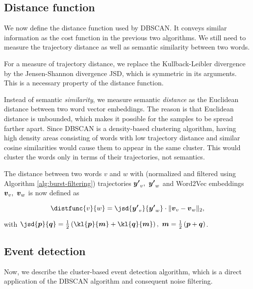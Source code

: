 \subsection{Distance function}
We now define the distance function used by DBSCAN. It conveys similar information as the cost function in the previous two algorithms. We still need to measure the trajectory distance as well as semantic similarity between two words.

For a measure of trajectory distance, we replace the Kullback-Leibler divergence by the Jensen-Shannon divergence JSD, which is symmetric in its arguments. This is a necessary property of the distance function.

Instead of semantic \textit{similarity}, we measure semantic \textit{distance} as the Euclidean distance between two word vector embeddings. The reason is that Euclidean distance is unbounded, which makes it possible for the samples to be spread farther apart. Since DBSCAN is a density-based clustering algorithm, having high density areas consisting of words with low trajectory distance and similar cosine similarities would cause them to appear in the same cluster. This would cluster the words only in terms of their trajectories, not semantics.

The distance between two words $v$ and $w$ with (normalized and filtered using Algorithm \ref{alg:burst-filtering}) trajectories $\vect{\trajn}_{v},\ \vect{\trajn}_{w}$ and Word2Vec embeddings $\embed_{v},\ \embed_{w}$ is now defined as

\begin{equation}
	\distfunc{v}{w} = \jsd{\vect{\trajn}_{v}}{\vect{\trajn}_{w}} \cdot \| \embed_{v} - \embed_{w}\|_{2},
\end{equation}

with $\jsd{\vect{p}}{\vect{q}} = \frac{1}{2} \left( \kl{\vect{p}}{\vect{m}} + \kl{\vect{q}}{\vect{m}} \right) ,\ \vect{m} = \frac{1}{2} \left( \vect{p} + \vect{q} \right)$.


\subsection{Event detection}
Now, we describe the cluster-based event detection algorithm, which is a direct application of the DBSCAN algorithm and consequent noise filtering.

